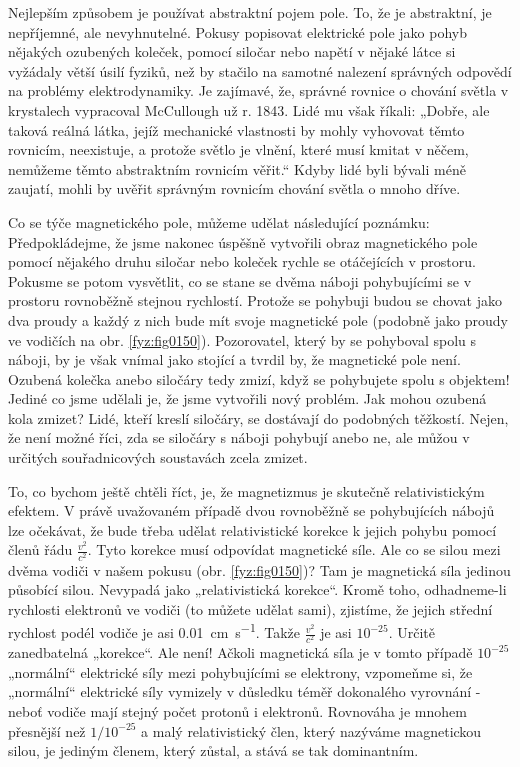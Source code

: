     Nejlepším způsobem je používat abstraktní pojem pole. To, že je abstraktní, je nepříjemné, ale  
    nevyhnutelné. Pokusy popisovat elektrické pole jako pohyb nějakých ozubených koleček, pomocí 
    siločar nebo napětí v nějaké látce si vyžádaly větší úsilí fyziků, než by stačilo na samotné 
    nalezení správných odpovědí na problémy elektrodynamiky. Je zajímavé, že, správné rovnice o 
    chování světla v krystalech vypracoval McCullough už r. 1843. Lidé mu však říkali: „Dobře, ale 
    taková reálná látka, jejíž mechanické vlastnosti by mohly vyhovovat těmto rovnicím, neexistuje, 
    a protože světlo je vlnění, které musí kmitat v něčem, nemůžeme těmto abstraktním rovnicím 
    věřit.“ Kdyby lidé byli bývali méně zaujatí, mohli by uvěřit správným rovnicím chování světla o 
    mnoho dříve.
    
    Co se týče magnetického pole, můžeme udělat následující poznámku: Předpokládejme, že jsme 
    nakonec úspěšně vytvořili obraz magnetického pole pomocí nějakého druhu siločar nebo koleček 
    rychle se otáčejících v prostoru. Pokusme se potom vysvětlit, co se stane se dvěma náboji 
    pohybujícími se v prostoru rovnoběžně stejnou rychlostí. Protože se pohybuji budou se chovat 
    jako dva proudy a každý z nich bude mít svoje magnetické pole (podobně jako proudy ve vodičích 
    na obr. \ref{fyz:fig0150}). Pozorovatel, který by se pohyboval spolu s náboji, by je 
    však vnímal jako stojící a tvrdil by, že magnetické pole není. Ozubená kolečka anebo siločáry 
    tedy zmizí, když se pohybujete spolu s objektem! Jediné co jsme udělali je, že jsme vytvořili 
    nový problém. Jak mohou ozubená kola zmizet? Lidé, kteří kreslí siločáry, se dostávají do 
    podobných těžkostí. Nejen, že není možné říci, zda se siločáry s náboji pohybují anebo ne, ale 
    můžou v určitých souřadnicových soustavách zcela zmizet.
    
    To, co bychom ještě chtěli říct, je, že magnetizmus je skutečně relativistickým efektem. V právě
    uvažovaném případě dvou rovnoběžně se pohybujících nábojů lze očekávat, že bude třeba udělat  
    relativistické korekce k jejich pohybu pomocí členů řádu \(\frac{v^2}{c^2}\). Tyto korekce musí 
    odpovídat magnetické síle. Ale co se silou mezi dvěma vodiči v našem pokusu (obr. 
    \ref{fyz:fig0150})? Tam je magnetická síla jedinou působící silou. Nevypadá jako 
    „relativistická korekce“. Kromě toho, odhadneme-li rychlosti elektronů ve vodiči (to můžete 
    udělat sami), zjistíme, že jejich střední rychlost podél vodiče je asi 
    \qty{0,01}{\centi\metre\per\second}. Takže \(\frac{v^2}{c^2}\) je asi \(10^{-25}\). Určitě 
    zanedbatelná „korekce“. Ale není! Ačkoli magnetická síla je v tomto případě \(10^{-25}\) 
    „normální“ elektrické síly mezi pohybujícími se elektrony, vzpomeňme si, že „normální“ 
    elektrické síly vymizely v důsledku téměř dokonalého vyrovnání - neboť vodiče mají stejný počet 
    protonů i elektronů. Rovnováha je mnohem přesnější než \(1/10^{-25}\) a malý relativistický 
    člen, který nazýváme magnetickou silou, je jediným členem, který zůstal, a stává se tak 
    dominantním.
    
